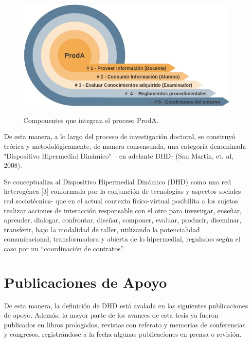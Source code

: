 \begin{figure}
 
\begin{center}
 \includegraphics[scale=0.55]{Ch0/ProdA.jpg}
\label{fig:proda}
\caption{Componentes que integran el proceso ProdA.} 
\end{center}

\end{figure}




De esta manera, a lo largo del proceso de investigación doctoral, se construyó teórica y metodológicamente, de manera consensuada, una categoría denominada "Dispositivo Hipermedial Dinámico" – en adelante DHD- (San Martín, et. al, 2008).  


\begin{defi}

Se conceptualiza al Dispositivo Hipermedial Dinámico (DHD) como una red heterogénea [3] conformada por la conjunción de tecnologías y aspectos sociales -red sociotécnica- que en el actual contexto físico-virtual posibilita a los sujetos realizar acciones de interacción responsable con el otro para investigar, enseñar, aprender, dialogar, confrontar, diseñar, componer, evaluar, producir, diseminar, transferir, bajo la modalidad de taller, utilizando la potencialidad comunicacional, transformadora y abierta de lo hipermedial, regulados según el caso por un “coordinación de contratos”. \cite{arqDHD20}

\end{defi}



\section{Publicaciones de Apoyo}

De esta manera, la definición de DHD está avalada en las siguientes publicaciones de apoyo. Además, la mayor parte de los avances de esta tesis ya fueron publicados en libros prologados, revistas con referato y memorias de conferencias y congresos, registrándose a la fecha algunas publicaciones en prensa o revisión.

